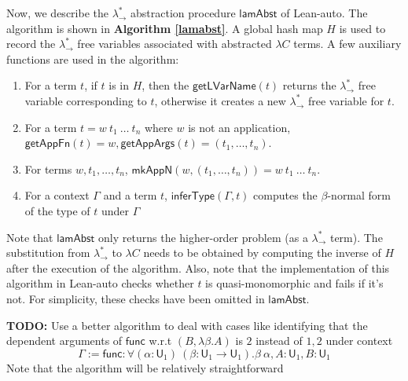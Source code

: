 Now, we describe the $\lambda_\to^*$ abstraction procedure $\mathsf{lamAbst}$ of Lean-auto. The algorithm
is shown in \textbf{Algorithm \ref{lamabst}}. A global hash map $H$ is used to record the $\lambda_\to^*$
free variables associated with abstracted $\lambda C$ terms. A few auxiliary functions are used in the algorithm:
\begin{enumerate}
  \item For a term $t$, if $t$ is in $H$, then the $\mathsf{getLVarName}(t)$ returns
    the $\lambda_\to^*$ free variable corresponding to $t$, otherwise it creates a new $\lambda_\to^*$ free variable for $t$.
  \item For a term $t = w \ t_1 \ \dots \ t_n$ where $w$ is not an application,
    $\mathsf{getAppFn}(t) = w, \mathsf{getAppArgs}(t) = (t_1, \dots, t_n)$.
  \item For terms $w, t_1, \dots, t_n$, $\mathsf{mkAppN}(w, (t_1, \dots, t_n)) = w \ t_1 \ \dots \ t_n$.
  \item For a context $\Gamma$ and a term $t$, $\mathsf{inferType}(\Gamma, t)$ computes the
    $\beta$-normal form of the type of $t$ under $\Gamma$
\end{enumerate}
Note that $\mathsf{lamAbst}$ only returns the higher-order problem (as a $\lambda_\to^*$ term). The
substitution from $\lambda_\to^*$ to $\lambda C$ needs to be obtained by computing the inverse of $H$ after
the execution of the algorithm. Also, note that the implementation of this algorithm in Lean-auto checks
whether $t$ is quasi-monomorphic and fails if it's not. For simplicity, these checks have been omitted in $\mathsf{lamAbst}$.

\noindent \textbf{TODO:} Use a better algorithm to deal with cases like identifying that
the dependent arguments of $\mathsf{func}$ w.r.t $(B, \lambda \beta. A)$ is $2$ instead of $1,2$ under context
$$\Gamma := \mathsf{func} : \forall (\alpha : \mathsf{U}_1) \ (\beta : \mathsf{U}_1 \to \mathsf{U}_1). \beta \ \alpha,
  A : \mathsf{U}_1, B : \mathsf{U}_1$$
Note that the algorithm will be relatively straightforward